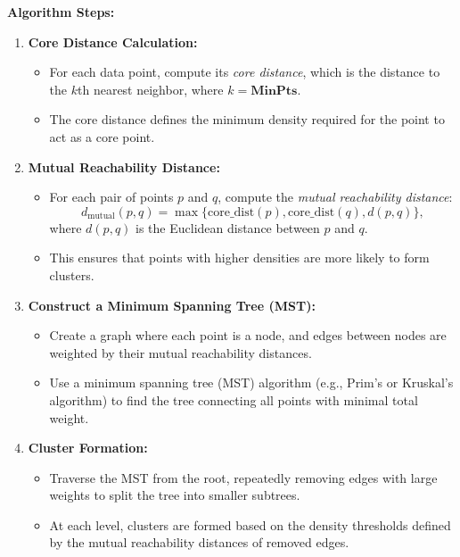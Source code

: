 \documentclass[12pt,a4paper]{article}
\begin{document}
\textbf{Algorithm Steps:}
\begin{enumerate}
    \item \textbf{Core Distance Calculation:}
    \begin{itemize}
        \item For each data point, compute its \textit{core distance}, which is the distance to the $k$th nearest neighbor, where $k = \textbf{MinPts}$.
        \item The core distance defines the minimum density required for the point to act as a core point.
    \end{itemize}
    
    \item \textbf{Mutual Reachability Distance:}
    \begin{itemize}
        \item For each pair of points $p$ and $q$, compute the \textit{mutual reachability distance}:
        \[
        d_{\text{mutual}}(p, q) = \max\{\text{core\_dist}(p), \text{core\_dist}(q), d(p, q)\},
        \]
        where $d(p, q)$ is the Euclidean distance between $p$ and $q$.
        \item This ensures that points with higher densities are more likely to form clusters.
    \end{itemize}
    
    \item \textbf{Construct a Minimum Spanning Tree (MST):}
    \begin{itemize}
        \item Create a graph where each point is a node, and edges between nodes are weighted by their mutual reachability distances.
        \item Use a minimum spanning tree (MST) algorithm (e.g., Prim's or Kruskal's algorithm) to find the tree connecting all points with minimal total weight.
    \end{itemize}
    
    \item \textbf{Cluster Formation:}
    \begin{itemize}
        \item Traverse the MST from the root, repeatedly removing edges with large weights to split the tree into smaller subtrees.
        \item At each level, clusters are formed based on the density thresholds defined by the mutual reachability distances of removed edges.
    \end{itemize}
    

\end{enumerate}
\end{document}
